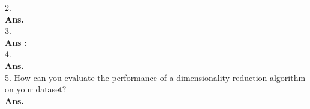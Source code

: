 \documentclass[a4paper, 11pt]{article}
\begin{document}
2.\\
\textbf{Ans.} 
\\

3.\\ 
\textbf{Ans :} \\
4.   \\
\textbf{Ans.} \\
5. How can you evaluate the performance of a dimensionality reduction algorithm on your dataset?
\\ \textbf{Ans. } \\
\end{document}
